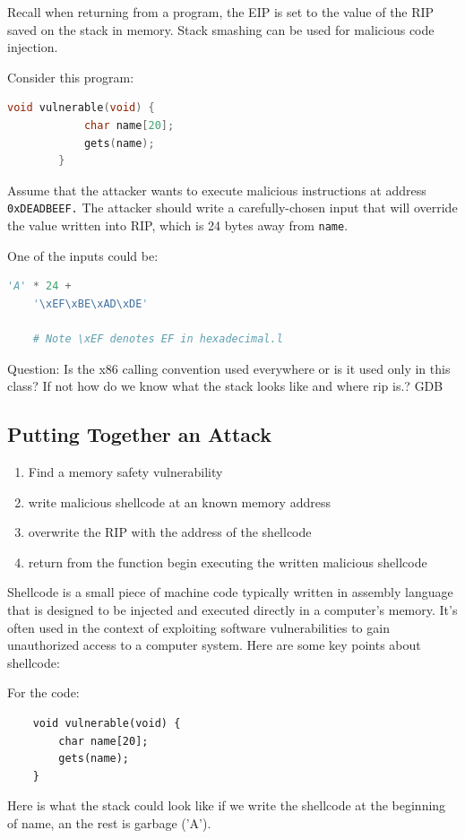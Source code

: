\documentclass{article}
\begin{document}
Recall when returning from a program, the EIP is set to the value of the RIP saved on the stack in memory. Stack smashing can be used for malicious code injection.


\begin{example}
    Consider this program:

    \begin{lstlisting}[language=C]
        void vulnerable(void) {
            char name[20];
            gets(name);
        }
    \end{lstlisting}
    Assume that the attacker wants to execute malicious instructions at address \lstinline{0xDEADBEEF.} The attacker should write a carefully-chosen input that will override the value written into RIP, which is 24 bytes away from \lstinline{name}.

    One of the inputs could be:
    \begin{lstlisting}[language=python]
    'A' * 24 +
    '\xEF\xBE\xAD\xDE'

    # Note \xEF denotes EF in hexadecimal.l
    \end{lstlisting}



\end{example}

{\color{red} Question: Is the x86 calling convention used everywhere or is it used only in this class? If not how do we know what the stack looks like and where rip is.?} GDB


\subsection{Putting Together an Attack}
\begin{enumerate}
    \item Find a memory safety vulnerability
    \item write malicious shellcode at an known memory address
    \item overwrite the RIP with the address of the shellcode
    \item return from the function begin executing the written malicious shellcode
\end{enumerate}

\begin{definition}[shellcode]
    Shellcode is a small piece of machine code typically written in assembly language that is designed to be injected and executed directly in a computer's memory. It's often used in the context of exploiting software vulnerabilities to gain unauthorized access to a computer system. Here are some key points about shellcode:
\end{definition}
For the code:
\begin{lstlisting}
    void vulnerable(void) {
        char name[20];
        gets(name);
    }
\end{lstlisting}
Here is what the stack could look like if we write the shellcode at the beginning of name, an the rest is garbage ('A').
\end{document}
